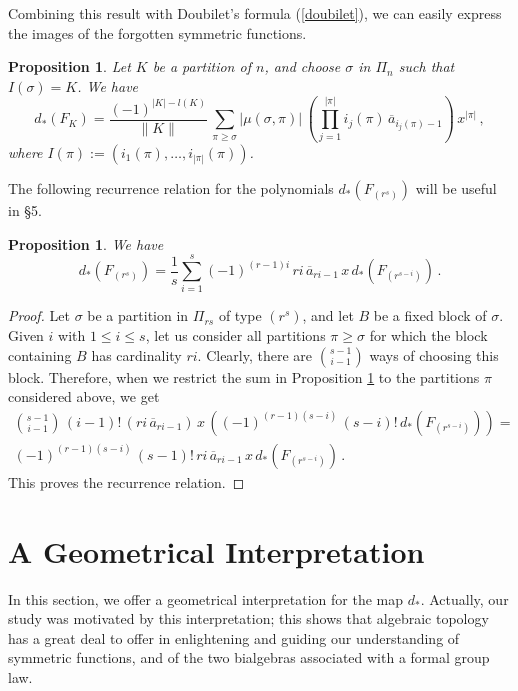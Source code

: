 \documentclass[a4paper,12pt]{amsart}
\newtheorem{prop}[equation]{Proposition}
\theoremstyle{definition}
\numberwithin{equation}{section}
\newcommand{\s}{\sigma}
\begin{document}
Combining this result with Doubilet's formula (\ref{doubilet}), we can easily express the images of the forgotten symmetric functions.
\begin{prop}\label{immonomial}
Let $K$ be a partition of $n$, and choose $\s$ in $\varPi_n$ such that $I(\s)=K$. We have
\[d_*(F_K)=\frac{(-1)^{|K|-l(K)}}{\|K\|}\,\sum_{\pi\ge\s}|\mu(\s,\pi)|\,\left(\prod_{j=1}^{|\pi|}i_j(\pi)\,\overline{a}_{i_j(\pi)-1}\right)\,x^{|\pi|}\,,\]
where $I(\pi):=(i_1(\pi),\ldots,i_{|\pi|}(\pi))$. 
\end{prop}

The following recurrence relation for the polynomials $d_*(F_{(r^s)})$ will be useful in \S5.

\begin{prop}\label{recur}
We have
\[d_*(F_{(r^s)})=\frac{1}{s}\sum_{i=1}^s (-1)^{(r-1)i}\, ri\,\overline{a}_{ri-1}\, x \,d_*(F_{(r^{s-i})})\,.\]
\end{prop}
\begin{proof}
Let $\s$ be a partition in $\varPi_{rs}$ of type $(r^s)$, and let $B$ be a fixed block of $\s$. Given $i$ with $1\le i\le s$, let us consider all partitions $\pi\ge\s$ for which the block containing $B$ has cardinality $ri$. Clearly, there are $\binom{s-1}{i-1}$ ways of choosing this block. Therefore, when we restrict the sum in Proposition \ref{immonomial} to the partitions $\pi$ considered above, we get
\begin{gather*} \binom{s-1}{i-1}\,(i-1)!\, (ri\,\overline{a}_{ri-1})\,x\,((-1)^{(r-1)(s-i)}\, (s-i)!\, d_*(F_{(r^{s-i})}))=\\(-1)^{(r-1)(s-i)}\,(s-1)!\,ri\, \overline{a}_{ri-1}\, x \,d_*(F_{(r^{s-i})})\,.
\end{gather*}
This proves the recurrence relation.
\end{proof}

\section{A Geometrical Interpretation}

In this section, we offer a geometrical interpretation for the map $d_*$. Actually, our study was motivated by this interpretation; this shows that algebraic topology has a great deal to offer in enlightening and guiding our understanding of symmetric functions, and of the two bialgebras associated with a formal group law. 
\end{document}
